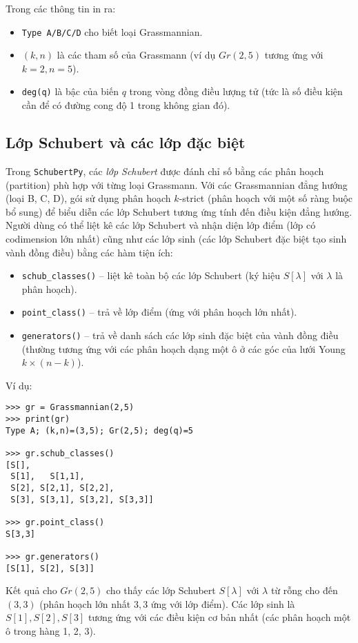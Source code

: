 Trong các thông tin in ra:
\begin{itemize}
    \item \texttt{Type A/B/C/D} cho biết loại Grassmannian.
    \item $(k,n)$ là các tham số của Grassmann (ví dụ $Gr(2,5)$ tương ứng với $k=2, n=5$).
    \item \texttt{deg(q)} là bậc của biến $q$ trong vòng đồng điều lượng tử (tức là số điều kiện cần để có đường cong độ 1 trong không gian đó).
\end{itemize}

\subsection{Lớp Schubert và các lớp đặc biệt}
Trong \texttt{SchubertPy}, các \textit{lớp Schubert} được đánh chỉ số bằng các phân hoạch (partition) phù hợp với từng loại Grassmann. Với các Grassmannian đẳng hướng (loại B, C, D), gói sử dụng phân hoạch $k$-strict (phân hoạch với một số ràng buộc bổ sung) để biểu diễn các lớp Schubert tương ứng tính đến điều kiện đẳng hướng. Người dùng có thể liệt kê các lớp Schubert và nhận diện lớp điểm (lớp có codimension lớn nhất) cũng như các lớp sinh (các lớp Schubert đặc biệt tạo sinh vành đồng điều) bằng các hàm tiện ích:
\begin{itemize}
    \item \texttt{schub\_classes()} – liệt kê toàn bộ các lớp Schubert (ký hiệu $S[\lambda]$ với $\lambda$ là phân hoạch).
    \item \texttt{point\_class()} – trả về lớp điểm (ứng với phân hoạch lớn nhất).
    \item \texttt{generators()} – trả về danh sách các lớp sinh đặc biệt của vành đồng điều (thường tương ứng với các phân hoạch dạng một ô ở các góc của lưới Young $k \times (n-k)$).
\end{itemize}

Ví dụ:
\small
\begin{verbatim}
>>> gr = Grassmannian(2,5)
>>> print(gr)
Type A; (k,n)=(3,5); Gr(2,5); deg(q)=5

>>> gr.schub_classes()
[S[],
 S[1],   S[1,1],
 S[2], S[2,1], S[2,2],
 S[3], S[3,1], S[3,2], S[3,3]]

>>> gr.point_class()
S[3,3]

>>> gr.generators()
[S[1], S[2], S[3]]
\end{verbatim}
\normalsize

Kết quả cho $Gr(2,5)$ cho thấy các lớp Schubert $S[\lambda]$ với $\lambda$ từ rỗng cho đến $(3,3)$ (phân hoạch lớn nhất $3,3$ ứng với lớp điểm). Các lớp sinh là $S[1], S[2], S[3]$ tương ứng với các điều kiện cơ bản nhất (các phân hoạch một ô trong hàng 1, 2, 3).

